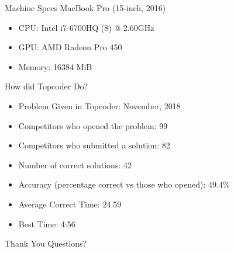 \documentclass[10pt]{beamer}
\begin{document}
\begin{frame}{Machine Specs}
  \Large
  MacBook Pro (15-inch, 2016)
  \begin{itemize} %
    \item CPU\@: Intel i7\@-6700HQ (8) @ 2.60GHz
    \item GPU\@: AMD Radeon Pro 450
    \item Memory: 16384 MiB
  \end{itemize}

\end{frame}

\begin{frame}{How did Topcoder Do?}
  \large
  \begin{itemize}
    \item Problem Given in Topcoder: November, 2018
    \item Competitors who opened the problem: 99
    \item Competitors who submitted a solution: 82
    \item Number of correct solutions: 42
    \item Accuracy (percentage correct vs those who opened): 49.4\%
    \item Average Correct Time: 24.59
    \item Best Time: 4:56
  \end{itemize}
\end{frame}

\begin{frame}{Thank You}
  \Huge Questions?
\end{frame}
\end{document}
